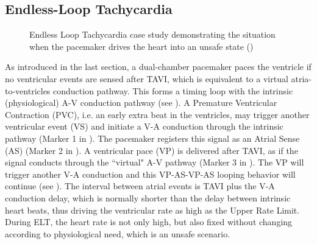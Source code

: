 \subsection{Endless-Loop Tachycardia}
\begin{figure}
\centering
	\caption{Endless Loop Tachycardia case study demonstrating the situation when the pacemaker drives the heart into an unsafe state (\cite{vhm_iccps11})}
\end{figure}

As introduced in the last section, a dual-chamber pacemaker paces the ventricle if no ventricular events are sensed after TAVI, which is equivalent to a virtual atria-to-ventricles conduction pathway. 
This forms a timing loop with the intrinsic (physiological) A-V conduction pathway (see ). 
A Premature Ventricular Contraction (PVC), i.e. an early extra beat in the ventricles, may trigger another ventricular event (VS) and initiate a V-A conduction through the intrinsic pathway (Marker 1 in ). 
The pacemaker registers this signal as an Atrial Sense (AS) (Marker 2 in ). 
A ventricular pace (VP) is delivered after TAVI, as if the signal conducts through the ``virtual" A-V pathway (Marker 3 in ). 
The VP will trigger another V-A conduction and this VP-AS-VP-AS looping behavior will continue (see ). 
The interval between atrial events is TAVI plus the V-A conduction delay, which is normally shorter than the delay between intrinsic heart beats, thus driving the ventricular rate as high as the Upper Rate Limit. 
During ELT, the heart rate is not only high, but also fixed without changing according to physiological need, which is an unsafe scenario.

